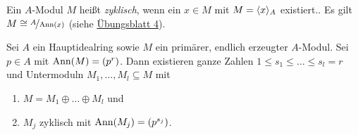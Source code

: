 \documentclass[12pt,a4paper]{scrartcl}
\theoremstyle{cplain}
\theoremstyle{cdef}
\begin{document}
\begin{defi}
	Ein $A$-Modul $M$ heißt \emph{zyklisch}, wenn ein $x\in M$ mit $M = \langle x\rangle_A$ existiert.. Es gilt $M\cong \nicefrac{A}{\operatorname{Ann}(x)}$ (siehe \href{http://www.math.uni-bonn.de/ag/stroppel/Franzen_Algebra_1_Uebung/Blatt4.pdf}{Übungsblatt 4}).
\end{defi}

\begin{satz} \label{thm:zerlegung primaer zyklisch}
	Sei $A$ ein Hauptidealring sowie $M$ ein primärer, endlich erzeugter $A$-Modul. Sei $p\in A$ mit $\operatorname{Ann}(M) = (p^r)$. Dann existieren ganze Zahlen $1\le s_1\le\dots \le s_l = r$ und  Untermoduln $M_1,\dots, M_l\subseteq M$ mit
	\begin{enumerate}
		\item $M = M_1\oplus\dots\oplus M_l$ und
		\item $M_j$ zyklisch mit $\operatorname{Ann}(M_j) =(p^{s_j})$.
	\end{enumerate}
\end{satz}
\end{document}

